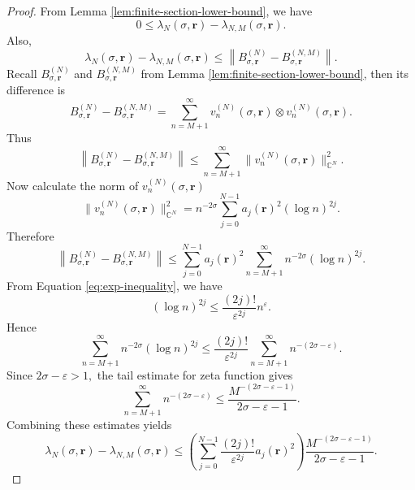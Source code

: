 \documentclass[12pt, reqno]{amsart}
\numberwithin{equation}{section}
\begin{document}
\begin{proof}
From Lemma \ref{lem:finite-section-lower-bound}, we have
\[
0\leq
\lambda_N(\sigma,\boldsymbol{r})
-
\lambda_{N,M}(\sigma,\boldsymbol{r}).
\]
Also,
\[
\lambda_N(\sigma,\boldsymbol{r})
-
\lambda_{N,M}(\sigma,\boldsymbol{r})
\leq
\left\|
B_{\sigma,\boldsymbol{r}}^{(N)}
-
B_{\sigma,\boldsymbol{r}}^{(N,M)}
\right\|.
\]
Recall $B_{\sigma,\boldsymbol{r}}^{(N)}$ and $
B_{\sigma,\boldsymbol{r}}^{(N,M)}$ from Lemma \ref{lem:finite-section-lower-bound}, then its difference is
\[
B_{\sigma,\boldsymbol{r}}^{(N)}
-
B_{\sigma,\boldsymbol{r}}^{(N,M)}
=
\sum_{n=M+1}^{\infty}
v_n^{(N)}(\sigma,\boldsymbol{r})\otimes v_n^{(N)}(\sigma,\boldsymbol{r}).
\]
Thus
\[
\left\|
B_{\sigma,\boldsymbol{r}}^{(N)}
-
B_{\sigma,\boldsymbol{r}}^{(N,M)}
\right\|
\leq
\sum_{n=M+1}^{\infty}
\|v_n^{(N)}(\sigma,\boldsymbol{r})\|_{\mathbb{C}^{N}}^{2}.
\]
Now calculate the norm of  $v_n^{(N)}(\sigma,\boldsymbol{r})$
\[
\|v_n^{(N)}(\sigma,\boldsymbol{r})\|_{\mathbb{C}^{N}}^{2}
=
n^{-2\sigma}
\sum_{j=0}^{N-1}
a_j(\boldsymbol{r})^{2}(\log n)^{2j}.
\]
Therefore
\[
\left\|
B_{\sigma,\boldsymbol{r}}^{(N)}
-
B_{\sigma,\boldsymbol{r}}^{(N,M)}
\right\|
\leq
\sum_{j=0}^{N-1}
a_j(\boldsymbol{r})^{2}
\sum_{n=M+1}^{\infty}
n^{-2\sigma}(\log n)^{2j}.
\]
From Equation \eqref{eq:exp-inequality}, we have
\[
(\log n)^{2j}
\leq
\frac{(2j)!}{\varepsilon^{2j}}n^{\varepsilon}.
\]
Hence
\[
\sum_{n=M+1}^{\infty}
n^{-2\sigma}(\log n)^{2j}
\leq
\frac{(2j)!}{\varepsilon^{2j}}
\sum_{n=M+1}^{\infty}
n^{-(2\sigma-\varepsilon)}.
\]
Since $2\sigma-\varepsilon>1,$ the tail estimate for zeta function gives
\[
\sum_{n=M+1}^{\infty}
n^{-(2\sigma-\varepsilon)}
\leq
\frac{M^{-(2\sigma-\varepsilon-1)}}{2\sigma-\varepsilon-1}.
\]
Combining these estimates yields
\[
\lambda_N(\sigma,\boldsymbol{r})
-
\lambda_{N,M}(\sigma,\boldsymbol{r})
\leq
\left(
\sum_{j=0}^{N-1}
\frac{(2j)!}{\varepsilon^{2j}}a_j(\boldsymbol{r})^{2}
\right)
\frac{M^{-(2\sigma-\varepsilon-1)}}{2\sigma-\varepsilon-1}.
\]

\end{proof}
\end{document}
